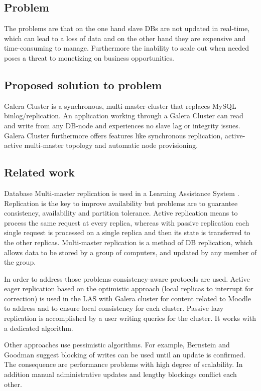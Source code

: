\documentclass{sig-alternate}
\begin{document}
\bigskip

\subsection{Problem}
The problems are that on the one hand slave DBs are not updated in real-time, which can lead to a loss of data and on the other hand they are expensive and time-consuming to manage. Furthermore the inability to scale out when needed poses a threat to monetizing on business opportunities.

\subsection{Proposed solution to problem}
Galera Cluster is a synchronous, multi-master-cluster that replaces MySQL binlog/replication. An application working through a Galera Cluster can read and write from any DB-node and experiences no slave lag or integrity issues. Galera Cluster furthermore offers features like synchronous replication, active-active multi-master topology and automatic node provisioning.

\subsection{Related work}
Database Multi-master replication is used in a Learning Assistance System \cite{gautam2016multi}. Replication is the key to improve availability but problems are to guarantee consistency, availability and partition tolerance.
Active replication means to process the same request at every replica, whereas with passive replication each single request is processed on a single replica and then its state is transferred to the other replicas.
Multi-master replication is a method of DB replication, which allows data to be stored by a group of computers, and updated by any member of the group.

In order to address those problems consistency-aware protocols are used. Active eager replication based on the optimistic approach (local replicas to interrupt for correction) is used in the LAS with Galera cluster for content related to Moodle to address and to ensure local consistency for each cluster. Passive lazy replication is accomplished by a user writing queries for the cluster. It works with a dedicated algorithm. 

Other approaches use pessimistic algorithms. For example, Bernstein and Goodman \cite{bernstein1985serializability} suggest blocking of writes can be used until an update is confirmed. The consequence are performance problems with high degree of scalability. In addition manual administrative updates and lengthy blockings conflict each other.
\end{document}
